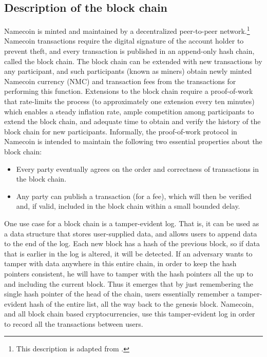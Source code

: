 \subsection{Description of the block chain}
Namecoin is minted and maintained by a decentralized peer-to-peer network.\footnote{This description is adapted from \cite{bonneau2014decentralizing}.}
Namecoin transactions require the digital signature of the account holder to prevent theft, and every transaction is published in an append-only hash chain, called the block chain. The block chain can be extended with new transactions by any participant, and such participants (known as miners) obtain newly minted Namecoin currency (NMC) and transaction fees from the transactions for performing this function. Extensions to the block chain require a proof-of-work that rate-limits the process (to approximately one extension every ten minutes) which enables a steady inflation rate, ample competition among participants to extend the block chain, and adequate time to obtain and verify the history of the block chain for new participants. Informally, the proof-of-work protocol in Namecoin is intended to maintain the following two essential properties about the block chain:

\begin{itemize}

  \item Every party eventually agrees on the order and correctness of transactions in the block chain.
  \item Any party can publish a transaction (for a fee), which will then be verified and, if valid, included in the block chain within a small bounded delay.

\end{itemize}

One use case for a block chain is a tamper-evident log. That is, it can be used as a data structure that stores user-supplied data, and allows users to append data to the end of the log. Each new block has a hash of the previous block, so if data that is earlier in the log is altered, it will be detected. If an adversary wants to tamper with data anywhere in this entire chain, in order to keep the hash pointers consistent, he will have to tamper with the hash pointers all the up to and including the current block. Thus it emerges that by just remembering the single hash pointer of the head of the chain, users essentially remember a tamper-evident hash of the entire list, all the way back to the genesis block. Namecoin, and all block chain based cryptocurrencies, use this tamper-evident log in order to record all the transactions between users. 


